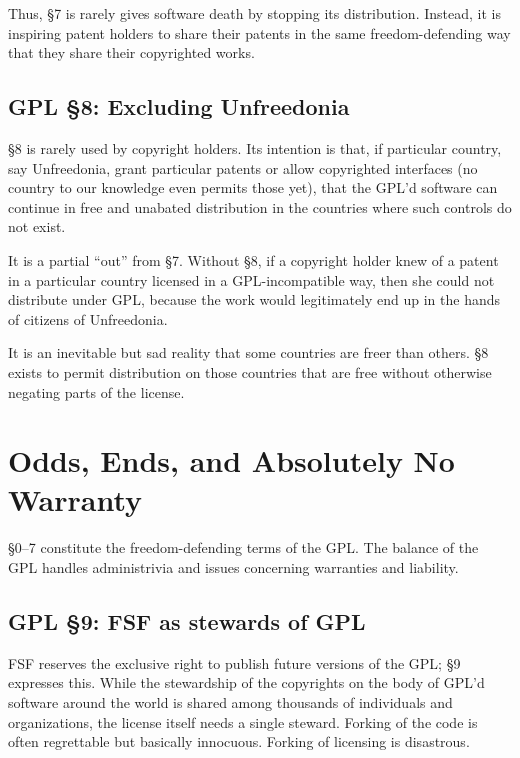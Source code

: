 \documentclass[12pt]{report}
\begin{document}
Thus, \S 7 is rarely gives software death by stopping its distribution.
Instead, it is inspiring patent holders to share their patents in the same
freedom-defending way that they share their copyrighted works.

\section{GPL \S 8: Excluding Unfreedonia}
\label{GPLs8}

\S 8 is rarely used by copyright holders.  Its intention is that, if
particular country, say Unfreedonia, grant particular patents or allow
copyrighted interfaces (no country to our knowledge even permits those
yet), that the GPL'd software can continue in free and unabated
distribution in the countries where such controls do not exist.

It is a partial ``out'' from \S 7.  Without \S 8, if a copyright holder
knew of a patent in a particular country licensed in a GPL-incompatible
way, then she could not distribute under GPL, because the work would
legitimately end up in the hands of citizens of Unfreedonia.

It is an inevitable but sad reality that some countries are freer than
others.  \S 8 exists to permit distribution on those countries that are
free without otherwise negating parts of the license.

\chapter{Odds, Ends, and Absolutely No Warranty}

\S 0--7 constitute the freedom-defending terms of the GPL.  The balance
of the GPL handles administrivia and issues concerning warranties and
liability.

\section{GPL \S 9: FSF as stewards of GPL}
\label{GPLs9}

FSF reserves the exclusive right to publish future versions of the GPL\@;
\S 9 expresses this.  While the stewardship of the copyrights on the body
of GPL'd software around the world is shared among thousands of
individuals and organizations, the license itself needs a single steward.
Forking of the code is often regrettable but basically innocuous.  Forking
of licensing is disastrous.
\end{document}
